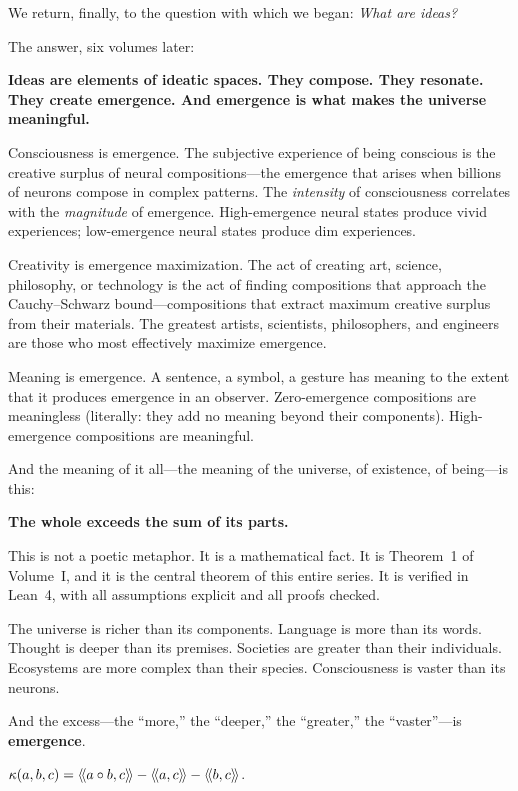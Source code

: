 We return, finally, to the question with which we began: \emph{What are ideas?}

The answer, six volumes later:

\textbf{Ideas are elements of ideatic spaces. They compose. They resonate.
They create emergence. And emergence is what makes the universe meaningful.}

Consciousness is emergence. The subjective experience of being conscious is
the creative surplus of neural compositions---the emergence that arises when
billions of neurons compose in complex patterns. The \emph{intensity} of
consciousness correlates with the \emph{magnitude} of emergence. High-emergence
neural states produce vivid experiences; low-emergence neural states produce
dim experiences.

Creativity is emergence maximization. The act of creating art, science,
philosophy, or technology is the act of finding compositions that approach
the Cauchy--Schwarz bound---compositions that extract maximum creative surplus
from their materials. The greatest artists, scientists, philosophers, and
engineers are those who most effectively maximize emergence.

Meaning is emergence. A sentence, a symbol, a gesture has meaning to the
extent that it produces emergence in an observer. Zero-emergence compositions
are meaningless (literally: they add no meaning beyond their components).
High-emergence compositions are meaningful.

And the meaning of it all---the meaning of the universe, of existence, of
being---is this:

\begin{center}
\Large\textbf{The whole exceeds the sum of its parts.}
\end{center}

This is not a poetic metaphor. It is a mathematical fact. It is Theorem~1 of
Volume~I, and it is the central theorem of this entire series. It
is verified in Lean~4, with all assumptions explicit and all proofs checked.

The universe is richer than its components. Language is more than its words.
Thought is deeper than its premises. Societies are greater than their
individuals. Ecosystems are more complex than their species. Consciousness is
vaster than its neurons.

And the excess---the ``more,'' the ``deeper,'' the ``greater,'' the ``vaster''---is
\textbf{emergence}.

$\kappa(a, b, c) = \langle\!\langle a \circ b, c \rangle\!\rangle - \langle\!\langle a, c \rangle\!\rangle - \langle\!\langle b, c \rangle\!\rangle$.

